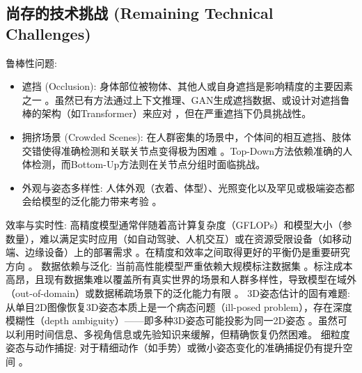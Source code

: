 \documentclass[12pt,a4paper]{article}
\begin{document}
\subsection{尚存的技术挑战 (Remaining Technical Challenges)}
鲁棒性问题:
\begin{itemize}
    \item 遮挡 (Occlusion): 身体部位被物体、其他人或自身遮挡是影响精度的主要因素之一 \cite{Rather2024HPEReview3D}。虽然已有方法通过上下文推理、GAN生成遮挡数据、或设计对遮挡鲁棒的架构（如Transformer）来应对 \cite{Li2019CrowdPose}，但在严重遮挡下仍具挑战性。
    \item 拥挤场景 (Crowded Scenes): 在人群密集的场景中，个体间的相互遮挡、肢体交错使得准确检测和关联关节点变得极为困难 \cite{Li2019CrowdPose}。Top-Down方法依赖准确的人体检测，而Bottom-Up方法则在关节点分组时面临挑战。
    \item 外观与姿态多样性: 人体外观（衣着、体型）、光照变化以及罕见或极端姿态都会给模型的泛化能力带来考验 \cite{Lin2014COCO}。
\end{itemize}
效率与实时性: 高精度模型通常伴随着高计算复杂度（GFLOPs）和模型大小（参数量），难以满足实时应用（如自动驾驶、人机交互）或在资源受限设备（如移动端、边缘设备）上的部署需求 \cite{Rather2024HPEReview3D}。在精度和效率之间取得更好的平衡仍是重要研究方向 \cite{Sun2023SHaRPose}。
数据依赖与泛化: 当前高性能模型严重依赖大规模标注数据集 \cite{Zhou2016HumanPoseSurvey}。标注成本高昂，且现有数据集难以覆盖所有真实世界的场景和人群多样性，导致模型在域外（out-of-domain）或数据稀疏场景下的泛化能力有限 \cite{Rather2024HPEReview3D}。
3D姿态估计的固有难题: 从单目2D图像恢复3D姿态本质上是一个病态问题（ill-posed problem），存在深度模糊性（depth ambiguity）——即多种3D姿态可能投影为同一2D姿态 \cite{Martinez2017Simple3D}。虽然可以利用时间信息、多视角信息或先验知识来缓解，但精确恢复仍然困难。
细粒度姿态与动作捕捉: 对于精细动作（如手势）或微小姿态变化的准确捕捉仍有提升空间 \cite{Geng2022KeypointAdaptiveLoss}。
\end{document}
